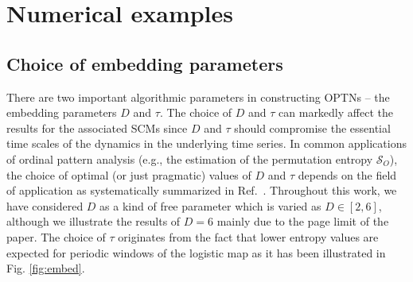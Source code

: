 \documentclass[aip,cha,reprint,nofootinbib]{revtex4-1}
\begin{document}
\section{Numerical examples}\label{sec:results1}

\subsection{Choice of embedding parameters} \label{sec:embeddings}
There are two important algorithmic parameters in constructing OPTNs -- the embedding parameters $D$ and $\tau$. The choice of $D$ and $\tau$ can markedly affect the results for the associated SCMs since $D$ and $\tau$ should compromise the essential time scales of the dynamics in the underlying time series. In common applications of ordinal pattern analysis (e.g., the estimation of the permutation entropy $\mathcal{S}_O$), the choice of optimal (or just pragmatic) values of $D$ and $\tau$ depends on the field of application as systematically summarized in Ref.~\cite{Riedl2013}. {\color{red}Throughout this work, we have considered $D$ as a kind of free parameter which is varied as $D \in [2, 6]$, although we illustrate the results of $D = 6$ mainly due to the page limit of the paper. The choice of $\tau$ originates from the fact that lower entropy values are expected for periodic windows of the logistic map as it has been illustrated in Fig. \ref{fig:embed}. }
\end{document}
